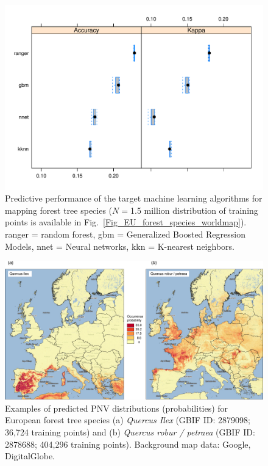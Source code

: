 \documentclass[fleqn,10pt,lineno]{wlpeerj} %
\begin{document}
\begin{figure}[!hbt]
\centering
\includegraphics[width=.7\linewidth]{Fig_8.pdf}
\caption{Predictive performance of the target machine learning algorithms for mapping forest tree species ($N=$1.5 million distribution of training points is available in Fig.\@~\ref{Fig_EU_forest_species_worldmap}). \textsf{ranger} = random forest, \textsf{gbm} = Generalized Boosted Regression Models, \textsf{nnet} = Neural networks, \textsf{kkn} = K-nearest neighbors.}
\label{Fig_boxplot_EU_forest_accuracy}
\end{figure}

\begin{figure}[!hbt]
\centering
\includegraphics[width=\linewidth]{Fig_9.png}
\caption{Examples of predicted PNV distributions (probabilities) for European forest tree species (a) \emph{Quercus Ilex} (GBIF ID: 2879098; 36,724 training points) and (b) \emph{Quercus robur / petraea} (GBIF ID: 2878688; 404,296 training points). Background map data: Google, DigitalGlobe.}
\label{Fig_EU_forest_species_map}
\end{figure}
\end{document}
